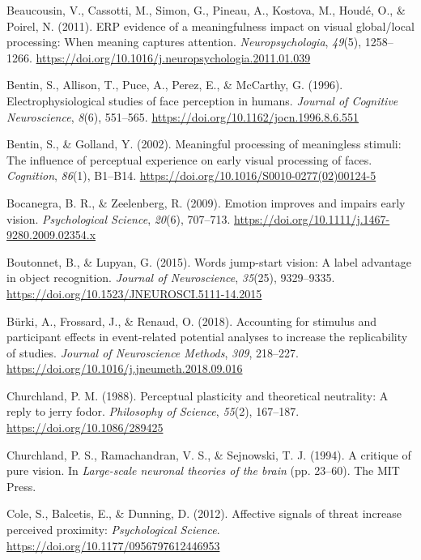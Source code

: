 \documentclass[
  english,
  man,11pt,floatsintext]{apa7}
\begin{document}
\leavevmode\hypertarget{ref-beaucousin2011}{}%
Beaucousin, V., Cassotti, M., Simon, G., Pineau, A., Kostova, M., Houdé, O., \& Poirel, N. (2011). ERP evidence of a meaningfulness impact on visual global/local processing: When meaning captures attention. \emph{Neuropsychologia}, \emph{49}(5), 1258--1266. \url{https://doi.org/10.1016/j.neuropsychologia.2011.01.039}

\leavevmode\hypertarget{ref-bentin1996}{}%
Bentin, S., Allison, T., Puce, A., Perez, E., \& McCarthy, G. (1996). Electrophysiological studies of face perception in humans. \emph{Journal of Cognitive Neuroscience}, \emph{8}(6), 551--565. \url{https://doi.org/10.1162/jocn.1996.8.6.551}

\leavevmode\hypertarget{ref-bentin2002}{}%
Bentin, S., \& Golland, Y. (2002). Meaningful processing of meaningless stimuli: The influence of perceptual experience on early visual processing of faces. \emph{Cognition}, \emph{86}(1), B1--B14. \url{https://doi.org/10.1016/S0010-0277(02)00124-5}

\leavevmode\hypertarget{ref-bocanegra2009}{}%
Bocanegra, B. R., \& Zeelenberg, R. (2009). Emotion improves and impairs early vision. \emph{Psychological Science}, \emph{20}(6), 707--713. \url{https://doi.org/10.1111/j.1467-9280.2009.02354.x}

\leavevmode\hypertarget{ref-boutonnet2015}{}%
Boutonnet, B., \& Lupyan, G. (2015). Words jump-start vision: A label advantage in object recognition. \emph{Journal of Neuroscience}, \emph{35}(25), 9329--9335. \url{https://doi.org/10.1523/JNEUROSCI.5111-14.2015}

\leavevmode\hypertarget{ref-buxfcrki2018}{}%
Bürki, A., Frossard, J., \& Renaud, O. (2018). Accounting for stimulus and participant effects in event-related potential analyses to increase the replicability of studies. \emph{Journal of Neuroscience Methods}, \emph{309}, 218--227. \url{https://doi.org/10.1016/j.jneumeth.2018.09.016}

\leavevmode\hypertarget{ref-churchland1988}{}%
Churchland, P. M. (1988). Perceptual plasticity and theoretical neutrality: A reply to jerry fodor. \emph{Philosophy of Science}, \emph{55}(2), 167--187. \url{https://doi.org/10.1086/289425}

\leavevmode\hypertarget{ref-churchland1994}{}%
Churchland, P. S., Ramachandran, V. S., \& Sejnowski, T. J. (1994). A critique of pure vision. In \emph{Large-scale neuronal theories of the brain} (pp. 23--60). The MIT Press.

\leavevmode\hypertarget{ref-cole2012}{}%
Cole, S., Balcetis, E., \& Dunning, D. (2012). Affective signals of threat increase perceived proximity: \emph{Psychological Science}. \url{https://doi.org/10.1177/0956797612446953}
\end{document}
